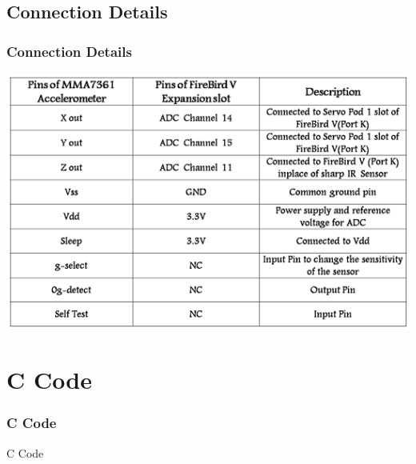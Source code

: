\documentclass[table,10pt,red]{beamer}	%
\begin{document}
\subsection{Connection Details} 
 \begin{frame}
	\frametitle{Connection Details}
\pause

\includegraphics[width=\linewidth]{Picture1.png}
		

\end{frame}

\section{C Code} 
 \begin{frame}
	\frametitle{C Code}
\begin{center}
\huge C Code
\end{center}		

\end{frame}
\end{document}
